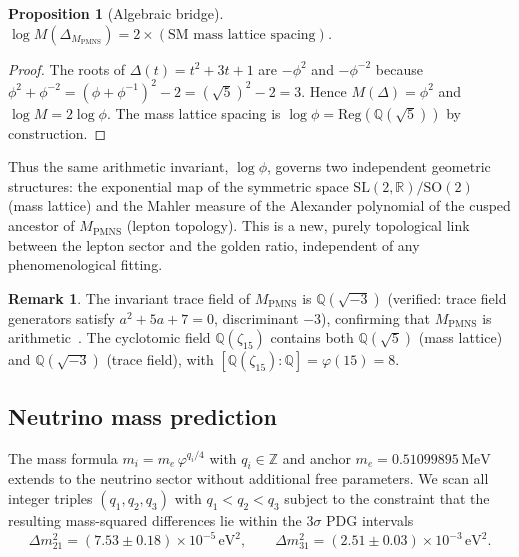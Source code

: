 ﻿\documentclass[12pt]{article}
\newtheorem{proposition}[theorem]{Proposition}
\theoremstyle{definition}
\newtheorem{remark}[theorem]{Remark}
\begin{document}
\begin{proposition}[Algebraic bridge]
\label{prop:mahler}
$\log M(\Delta_{M_\text{PMNS}}) = 2 \times (\text{SM mass lattice spacing})$.
\end{proposition}

\begin{proof}
The roots of $\Delta(t)=t^2+3t+1$ are $-\phi^2$ and $-\phi^{-2}$ because
$\phi^2+\phi^{-2}=(\phi+\phi^{-1})^2-2=(\sqrt{5})^2-2=3$.
Hence $M(\Delta)=\phi^2$ and $\log M = 2\log\phi$.  The mass lattice
spacing is $\log\phi = \mathrm{Reg}(\mathbb{Q}(\sqrt{5}))$ by construction.
\end{proof}

Thus the same arithmetic invariant, $\log\phi$, governs two independent
geometric structures: the exponential map of the symmetric space
$\mathrm{SL}(2,\mathbb{R})/\mathrm{SO}(2)$ (mass lattice) and the
Mahler measure of the Alexander polynomial of the cusped ancestor of
$M_\text{PMNS}$ (lepton topology).  This is a new, purely topological
link between the lepton sector and the golden ratio, independent of any
phenomenological fitting.

\begin{remark}
The invariant trace field of $M_\text{PMNS}$ is $\mathbb{Q}(\sqrt{-3})$
(verified: trace field generators satisfy $a^2+5a+7=0$, discriminant
$-3$), confirming that $M_\text{PMNS}$ is arithmetic~\cite{Chinburg98}.
The cyclotomic field $\mathbb{Q}(\zeta_{15})$ contains both
$\mathbb{Q}(\sqrt{5})$ (mass lattice) and $\mathbb{Q}(\sqrt{-3})$
(trace field), with $[\mathbb{Q}(\zeta_{15}):\mathbb{Q}]=\varphi(15)=8$.
\end{remark}


\subsection{Neutrino mass prediction}
\label{subsec:neutrino}

The mass formula $m_i = m_e\,\varphi^{q_i/4}$ with $q_i\in\mathbb{Z}$
and anchor $m_e = 0.51099895\,\text{MeV}$ extends to the neutrino sector
without additional free parameters.  We scan all integer triples
$(q_1,q_2,q_3)$ with $q_1<q_2<q_3$ subject to the constraint that the
resulting mass-squared differences lie within the $3\sigma$ PDG
intervals~\cite{PDG2024}
\begin{equation}
\Delta m^2_{21} = (7.53\pm0.18)\times10^{-5}\,\text{eV}^2, \qquad
\Delta m^2_{31} = (2.51\pm0.03)\times10^{-3}\,\text{eV}^2.
\end{equation}
\end{document}
